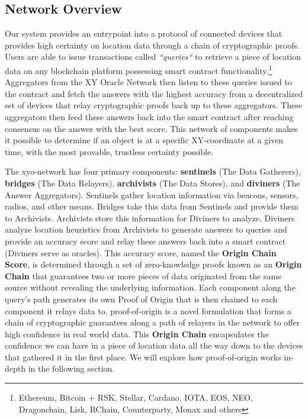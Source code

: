 \documentclass{article}
\begin{document}
\subsection {Network Overview}
Our system provides an entrypoint into a protocol of connected devices that provides high certainty on location data through a chain of cryptographic proofs. Users are able to issue transactions called \textit{``queries``} to retrieve a piece of location data on any blockchain platform possessing smart contract functionality.\footnote{Ethereum, Bitcoin + RSK, Stellar, Cardano, IOTA, EOS, NEO, Dragonchain, Lisk, RChain, Counterparty, Monax and others} Aggregators from the XY Oracle Network then listen to these queries issued to the contract and fetch the answers with the highest accuracy from a decentralized set of devices that relay cryptographic proofs back up to these aggregators. These aggregators then feed these answers back into the smart contract after reaching consensus on the answer with the best score. This network of components makes it possible to determine if an object is at a specific XY-coordinate at a given time, with the most provable, trustless certainty possible.

The \Gls{xyo-network} has four primary components: \textbf{\Glspl{sentinel}} (The Data Gatherers), \textbf{\Glspl{bridge}} (The Data Relayers), \textbf{\Glspl{archivist}} (The Data Stores), and \textbf{\Glspl{diviner}} (The Answer Aggregators). Sentinels gather location information via beacons, sensors, radios, and other means. Bridges take this data from Sentinels and provide them to Archivists. Archivists store this information for Diviners to analyze. Diviners analyze location heuristics from Archivists to generate answers to queries and provide an accuracy score and relay these answers back into a smart contract (Diviners serve as oracles). This accuracy score, named the \textbf{Origin Chain Score}, is determined through a set of zero-knowledge proofs known as an \textbf{Origin Chain} that guarantees two or more pieces of data originated from the same source without revealing the underlying information. Each component along the query's path generates its own Proof of Origin that is then chained to each component it relays data to. \Gls{proof-of-origin} is a novel formulation that forms a chain of cryptographic guarantees along a path of relayers in the network to offer high confidence in real world data. This \textbf{Origin Chain} encapsulates the confidence we can have in a piece of location data all the way down to the devices that gathered it in the first place. We will explore how \Gls{proof-of-origin} works in-depth in the following section.
\end{document}
